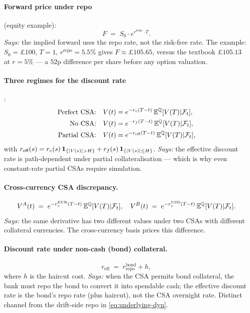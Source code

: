 \documentclass[11pt,a4paper]{article}
\begin{document}
\paragraph{Forward price under repo} (equity example):
\begin{equation}\label{eq:fwd-equity}
  F \;=\; S_0 \cdot e^{r^{\text{repo}} \cdot T}.
\end{equation}
\textit{Says:} the implied forward uses the repo rate, not the
risk-free rate. The example: $S_0 = \pounds 100$, $T = 1$,
$r^{\text{repo}} = 5.5\%$ gives $F \approx \pounds 105.65$, versus
the textbook $\pounds 105.13$ at $r = 5\%$ --- a $52$p difference
per share before any option valuation.

\paragraph{Three regimes for the discount rate}:
\begin{align}
  \text{Perfect CSA:} \quad V(t) &= e^{-r_c (T-t)}\, \mathbb{E}^{\mathbb{Q}}[V(T) | \mathcal{F}_{t}], \label{eq:reg-perfect}\\
  \text{No CSA:}      \quad V(t) &= e^{-r_f (T-t)}\, \mathbb{E}^{\mathbb{Q}}[V(T) | \mathcal{F}_{t}], \label{eq:reg-none}\\
  \text{Partial CSA:} \quad V(t) &= e^{-r_{\text{eff}} (T-t)}\, \mathbb{E}^{\mathbb{Q}}[V(T) | \mathcal{F}_{t}], \label{eq:reg-partial}
\end{align}
with $r_{\text{eff}}(s) = r_c(s)\,\mathbf{1}_{\{|V(s)| > H\}} + r_f(s)\,\mathbf{1}_{\{|V(s)| \le H\}}$.
\textit{Says:} the effective discount rate is path-dependent under
partial collateralisation --- which is why even constant-rate partial
CSAs require simulation.

\paragraph{Cross-currency CSA discrepancy.}
\begin{equation}\label{eq:xccy-csa}
  V^A(t) \;=\; e^{-r_c^{\text{EUR}} (T-t)}\, \mathbb{E}^{\mathbb{Q}}[V(T) | \mathcal{F}_{t}],
  \quad
  V^B(t) \;=\; e^{-r_c^{\text{USD}} (T-t)}\, \mathbb{E}^{\mathbb{Q}}[V(T) | \mathcal{F}_{t}].
\end{equation}
\textit{Says:} the same derivative has two different values under two
CSAs with different collateral currencies. The cross-currency basis
prices this difference.

\paragraph{Discount rate under non-cash (bond) collateral.}
\begin{equation}\label{eq:disc-bond-coll}
  r_{\text{eff}} \;=\; r^{\text{bond}}_{\text{repo}} + h,
\end{equation}
where $h$ is the haircut cost.
\textit{Says:} when the CSA permits bond collateral, the bank must
repo the bond to convert it into spendable cash; the effective
discount rate is the bond's repo rate (plus haircut), not the CSA
overnight rate. Distinct channel from the drift-side repo in
\eqref{eq:underlying-dyn}.
\end{document}
